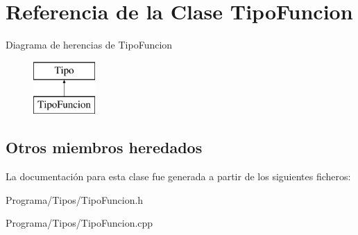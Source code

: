 \hypertarget{class_tipo_funcion}{\section{Referencia de la Clase Tipo\-Funcion}
\label{class_tipo_funcion}
}
Diagrama de herencias de Tipo\-Funcion\begin{figure}[H]
\begin{center}
\leavevmode
\includegraphics[height=2.000000cm]{class_tipo_funcion}
\end{center}
\end{figure}
\subsection*{Otros miembros heredados}


La documentación para esta clase fue generada a partir de los siguientes ficheros\-:\begin{DoxyCompactItemize}
\item 
Programa/\-Tipos/Tipo\-Funcion.\-h\item 
Programa/\-Tipos/Tipo\-Funcion.\-cpp\end{DoxyCompactItemize}
